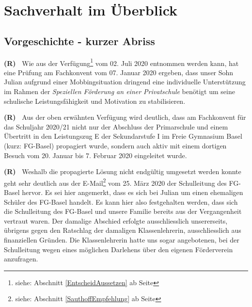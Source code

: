 \documentclass[paper=a4,fontsize=12pt, oneside, numbers=noenddot]{scrbook}
\newcounter{rz}
\newcommand{\Rz}{
	\addtocounter{rz}{1}\textbf{(R\arabic{rz})~}
}
\newcommand{\footnoteExt}[1]{\footnote{siehe: Abschnitt \ref{#1} ab Seite \pageref{#1}}}
\begin{document}
\clearpairofpagestyles %
\chead{\headmark} %
\cfoot*{\pagemark} %


\tableofcontents

\chapter{Sachverhalt im Überblick}

\section{Vorgeschichte - kurzer Abriss}
\Rz Wie aus der Verfügung\footnoteExt{EntscheidAussetzen} vom 02. Juli 2020 entnommen werden kann, hat eine Prüfung am Fachkonvent vom 07. Januar 2020 ergeben, dass unser Sohn Julian aufgrund einer Mobbingsituation dringend eine individuelle Unterstützung im Rahmen der \textit{Speziellen Förderung an einer Privatschule} benötigt um seine schulische Leistungsfähigkeit und Motivation zu stabilisieren. 

\Rz Aus der oben erwähnten Verfügung wird deutlich, dass am Fachkonvent für das Schuljahr 2020/21 nicht nur der Abschluss der Primarschule und einem Übertritt in den Leistungszug E der Sekundarstufe I im Freie Gymnasium Basel (kurz: FG-Basel) propagiert wurde, sondern auch aktiv mit einem dortigen Besuch vom 20. Januar bis 7. Februar 2020 eingeleitet wurde. 

\Rz Weshalb die propagierte Lösung nicht endgültig umgesetzt werden konnte geht sehr deutlich aus der E-Mail\footnoteExt{SauthoffEmpfehlung} vom 25. März 2020 der Schulleitung des FG-Basel hervor. Es sei hier angemerkt, dass es sich bei Julian um einen ehemaligen Schüler des FG-Basel handelt. Es kann hier also festgehalten werden, dass sich die Schulleitung des FG-Basel und unsere Familie bereits aus der Vergangenheit vertraut waren. Der damalige Abschied erfolgte ausschliesslich unsererseits, übrigens gegen den Ratschlag der damaligen Klassenlehrerin, ausschliesslich aus finanziellen Gründen. Die Klassenlehrerin hatte uns sogar angebotenen, bei der Schulleitung wegen eines möglichen Darlehens über den eigenen Förderverein anzufragen.
\end{document}
